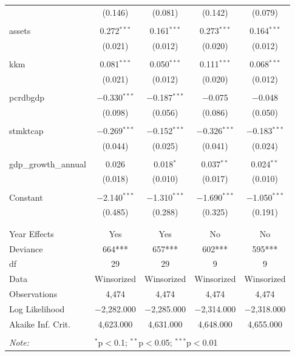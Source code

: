 \documentclass[a4paper, nobind]{templates/ociamthesis}
\begin{document}
\begin{table}[!htbp]
\begin{tabular}{@{\extracolsep{5pt}}lcccc}
  & (0.146) & (0.081) & (0.142) & (0.079) \\ 
  & & & & \\ 
 assets & 0.272$^{***}$ & 0.161$^{***}$ & 0.273$^{***}$ & 0.164$^{***}$ \\ 
  & (0.021) & (0.012) & (0.020) & (0.012) \\ 
  & & & & \\ 
 kkm & 0.081$^{***}$ & 0.050$^{***}$ & 0.111$^{***}$ & 0.068$^{***}$ \\ 
  & (0.021) & (0.012) & (0.020) & (0.012) \\ 
  & & & & \\ 
 pcrdbgdp & $-$0.330$^{***}$ & $-$0.187$^{***}$ & $-$0.075 & $-$0.048 \\ 
  & (0.098) & (0.056) & (0.086) & (0.050) \\ 
  & & & & \\ 
 stmktcap & $-$0.269$^{***}$ & $-$0.152$^{***}$ & $-$0.326$^{***}$ & $-$0.183$^{***}$ \\ 
  & (0.044) & (0.025) & (0.041) & (0.024) \\ 
  & & & & \\ 
 gdp\_growth\_annual & 0.026 & 0.018$^{*}$ & 0.037$^{**}$ & 0.024$^{**}$ \\ 
  & (0.018) & (0.010) & (0.017) & (0.010) \\ 
  & & & & \\ 
 Constant & $-$2.140$^{***}$ & $-$1.310$^{***}$ & $-$1.690$^{***}$ & $-$1.050$^{***}$ \\ 
  & (0.485) & (0.288) & (0.325) & (0.191) \\ 
  & & & & \\ 
\hline \\[-1.8ex] 
Year Effects & Yes & Yes & No & No \\ 
Deviance & 664*** & 657*** & 602*** & 595*** \\ 
df & 29 & 29 & 9 & 9 \\ 
Data & Winsorized & Winsorized & Winsorized & Winsorized \\ 
Observations & 4,474 & 4,474 & 4,474 & 4,474 \\ 
Log Likelihood & $-$2,282.000 & $-$2,285.000 & $-$2,314.000 & $-$2,318.000 \\ 
Akaike Inf. Crit. & 4,623.000 & 4,631.000 & 4,648.000 & 4,655.000 \\ 
\hline 
\hline \\[-1.8ex] 
\textit{Note:}  & \multicolumn{4}{l}{$^{*}$p$<$0.1; $^{**}$p$<$0.05; $^{***}$p$<$0.01} \\ 
\end{tabular} 
\end{table}
\end{document}
